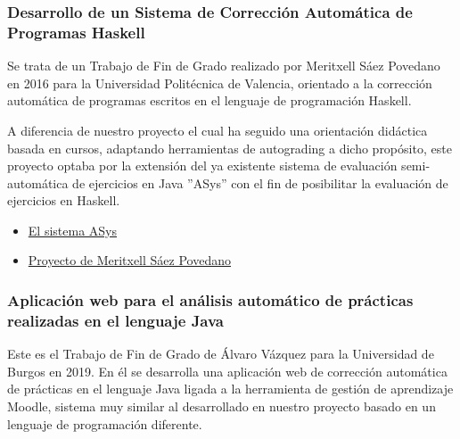 \subsubsection{Desarrollo de un Sistema de Corrección Automática de Programas Haskell}
Se trata de un Trabajo de Fin de Grado realizado por Meritxell Sáez Povedano\cite{MeritxellSaezPovedano} en 2016 para la Universidad Politécnica de Valencia, orientado a la corrección automática de programas escritos en el lenguaje de programación Haskell.

A diferencia de nuestro proyecto el cual ha seguido una orientación didáctica basada en cursos, adaptando herramientas de autograding a dicho propósito, este proyecto optaba por la extensión del ya existente sistema de evaluación semi-automática de ejercicios en Java ''ASys''\cite{tool:ASys} con el fin de posibilitar la evaluación de ejercicios en Haskell.

\begin{itemize}
\item \href{http://personales.upv.es/josilga/ASys/about.html}{El sistema ASys}
\item \href{https://riunet.upv.es/handle/10251/72442?show=full}{Proyecto de Meritxell Sáez Povedano} 
\end{itemize}



\subsubsection{Aplicación web para el análisis automático de prácticas realizadas en el lenguaje Java}
Este es el Trabajo de Fin de Grado de Álvaro Vázquez\cite{AlvaroVazquez} para la Universidad de Burgos en 2019. En él se desarrolla una aplicación web de corrección automática de prácticas en el lenguaje Java ligada a la herramienta de gestión de aprendizaje Moodle, sistema muy similar al desarrollado en nuestro proyecto basado en un lenguaje de programación diferente.